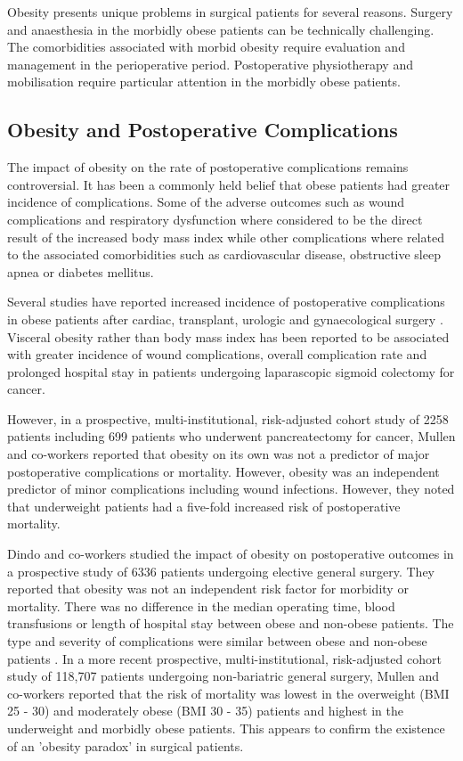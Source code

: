 Obesity presents unique problems in surgical patients for several reasons. 
Surgery and anaesthesia in the morbidly obese patients can be technically challenging. 
The comorbidities associated with morbid obesity require evaluation and management in the perioperative period. 
Postoperative physiotherapy and mobilisation require particular attention in the morbidly obese patients. 

\subsection{Obesity and Postoperative Complications}

The impact of obesity on the rate of postoperative complications remains controversial. 
It has been a commonly held belief that obese patients had greater incidence of complications. 
Some of the adverse outcomes such as wound complications and respiratory dysfunction where considered to be the direct result of the increased body mass index while other complications where related to the associated comorbidities such as cardiovascular disease, obstructive sleep apnea or diabetes mellitus. 

Several studies have reported increased incidence of postoperative complications in obese patients after cardiac, transplant, urologic and gynaecological surgery \parencite{prem_operative_1965, holley_obesity_1990, fasol_influence_1992, gruberg_impact_2002, lee_impact_2004}. 
Visceral obesity rather than body mass index has been reported to be associated with greater incidence of wound complications, overall complication rate and prolonged hospital stay in patients undergoing laparascopic sigmoid colectomy for cancer. \parencite{tsujinaka_visceral_2008}

However, in a prospective, multi-institutional, risk-adjusted cohort study of 2258 patients including 699 patients who underwent pancreatectomy for cancer, Mullen and co-workers reported that obesity on its own was not a predictor of major postoperative complications or mortality. 
However, obesity was an independent predictor of minor complications including wound infections. 
However, they noted that underweight patients had a five-fold increased risk of postoperative mortality. \parencite{mullen_impact_2008}

Dindo and co-workers studied the impact of obesity on postoperative outcomes in a prospective study of 6336 patients undergoing elective general surgery. 
They reported that obesity was not an independent risk factor for morbidity or mortality. 
There was no difference in the median operating time, blood transfusions or length of hospital stay between obese and non-obese patients. 
The type and severity of complications were similar between obese and non-obese patients \parencite{dindo_obesity_2003}. 
In a more recent prospective, multi-institutional, risk-adjusted cohort study of 118,707 patients undergoing non-bariatric general surgery, Mullen and co-workers reported that the risk of mortality was lowest in the overweight (BMI 25 - 30) and moderately obese (BMI 30 - 35) patients and highest in the underweight and morbidly obese patients. 
This appears to confirm the existence of an 'obesity paradox' in surgical patients. \parencite{mullen_obesity_2009}

